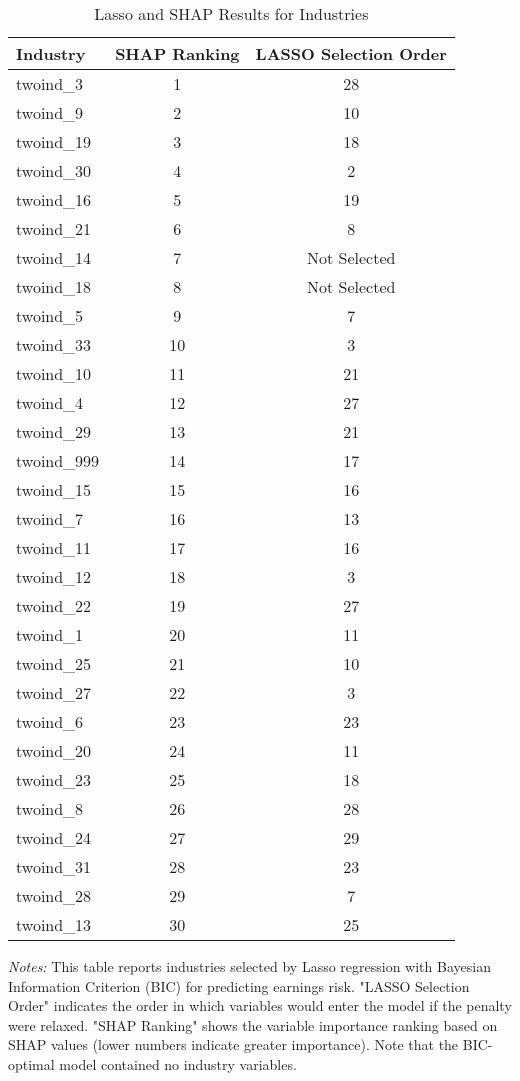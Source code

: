 \documentclass[12pt]{article}
\begin{document}
\begin{table}[H]
\centering
\caption{Lasso and SHAP Results for Industries}

\begin{tabular}{lcc}

\toprule
Industry & SHAP Ranking & LASSO Selection Order\\
\midrule
twoind\_3 & 1 & 28 \\
twoind\_9 & 2 & 10 \\
twoind\_19 & 3 & 18 \\
twoind\_30 & 4 & 2 \\
twoind\_16 & 5 & 19 \\
twoind\_21 & 6 & 8 \\
twoind\_14 & 7 & Not Selected \\
twoind\_18 & 8 & Not Selected \\
twoind\_5 & 9 & 7 \\
twoind\_33 & 10 & 3 \\
twoind\_10 & 11 & 21 \\
twoind\_4 & 12 & 27 \\
twoind\_29 & 13 & 21 \\
twoind\_999 & 14 & 17 \\
twoind\_15 & 15 & 16 \\
twoind\_7 & 16 & 13 \\
twoind\_11 & 17 & 16 \\
twoind\_12 & 18 & 3 \\
twoind\_22 & 19 & 27 \\
twoind\_1 & 20 & 11 \\
twoind\_25 & 21 & 10 \\
twoind\_27 & 22 & 3 \\
twoind\_6 & 23 & 23 \\
twoind\_20 & 24 & 11 \\
twoind\_23 & 25 & 18 \\
twoind\_8 & 26 & 28 \\
twoind\_24 & 27 & 29 \\
twoind\_31 & 28 & 23 \\
twoind\_28 & 29 & 7 \\
twoind\_13 & 30 & 25 \\
\bottomrule
\end{tabular}%
\newline

\footnotesize
\textit{Notes:} This table reports industries selected by Lasso regression with Bayesian Information Criterion (BIC) for predicting earnings risk. "LASSO Selection Order" indicates the order in which variables would enter the model if the penalty were relaxed. "SHAP Ranking" shows the variable importance ranking based on SHAP values (lower numbers indicate greater importance). Note that the BIC-optimal model contained no industry variables.

\end{table}
\end{document}
